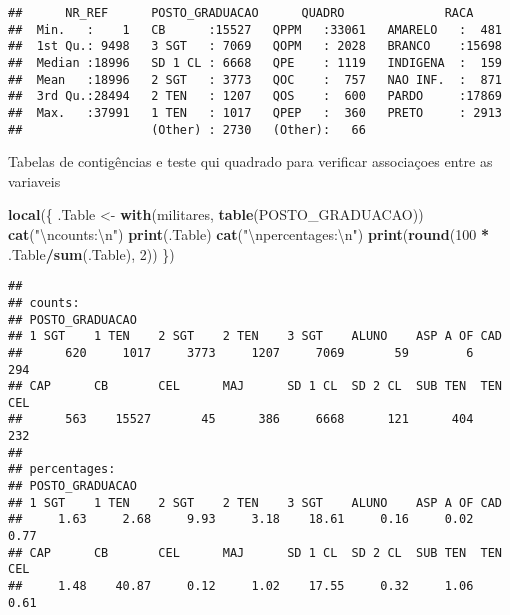 \documentclass[
]{article}
\newenvironment{Shaded}{\begin{snugshade}}{\end{snugshade}}
\newcommand{\CharTok}[1]{\textcolor[rgb]{0.31,0.60,0.02}{#1}}
\newcommand{\DecValTok}[1]{\textcolor[rgb]{0.00,0.00,0.81}{#1}}
\newcommand{\KeywordTok}[1]{\textcolor[rgb]{0.13,0.29,0.53}{\textbf{#1}}}
\newcommand{\NormalTok}[1]{#1}
\newcommand{\OperatorTok}[1]{\textcolor[rgb]{0.81,0.36,0.00}{\textbf{#1}}}
\newcommand{\StringTok}[1]{\textcolor[rgb]{0.31,0.60,0.02}{#1}}
\begin{document}
\begin{verbatim}
##      NR_REF      POSTO_GRADUACAO      QUADRO              RACA      
##  Min.   :    1   CB      :15527   QPPM   :33061   AMARELO   :  481  
##  1st Qu.: 9498   3 SGT   : 7069   QOPM   : 2028   BRANCO    :15698  
##  Median :18996   SD 1 CL : 6668   QPE    : 1119   INDIGENA  :  159  
##  Mean   :18996   2 SGT   : 3773   QOC    :  757   NAO INF.  :  871  
##  3rd Qu.:28494   2 TEN   : 1207   QOS    :  600   PARDO     :17869  
##  Max.   :37991   1 TEN   : 1017   QPEP   :  360   PRETO     : 2913  
##                  (Other) : 2730   (Other):   66
\end{verbatim}

Tabelas de contigências e teste qui quadrado para verificar associaçoes
entre as variaveis

\begin{Shaded}
\begin{Highlighting}[]
\KeywordTok{local}\NormalTok{(\{}
\NormalTok{    .Table <-}\StringTok{ }\KeywordTok{with}\NormalTok{(militares, }\KeywordTok{table}\NormalTok{(POSTO_GRADUACAO))}
    \KeywordTok{cat}\NormalTok{(}\StringTok{"}\CharTok{\textbackslash{}n}\StringTok{counts:}\CharTok{\textbackslash{}n}\StringTok{"}\NormalTok{)}
    \KeywordTok{print}\NormalTok{(.Table)}
    \KeywordTok{cat}\NormalTok{(}\StringTok{"}\CharTok{\textbackslash{}n}\StringTok{percentages:}\CharTok{\textbackslash{}n}\StringTok{"}\NormalTok{)}
    \KeywordTok{print}\NormalTok{(}\KeywordTok{round}\NormalTok{(}\DecValTok{100} \OperatorTok{*}\StringTok{ }\NormalTok{.Table}\OperatorTok{/}\KeywordTok{sum}\NormalTok{(.Table), }\DecValTok{2}\NormalTok{))}
\NormalTok{\})}
\end{Highlighting}
\end{Shaded}

\begin{verbatim}
## 
## counts:
## POSTO_GRADUACAO
## 1 SGT    1 TEN    2 SGT    2 TEN    3 SGT    ALUNO    ASP A OF CAD      
##      620     1017     3773     1207     7069       59        6      294 
## CAP      CB       CEL      MAJ      SD 1 CL  SD 2 CL  SUB TEN  TEN CEL  
##      563    15527       45      386     6668      121      404      232 
## 
## percentages:
## POSTO_GRADUACAO
## 1 SGT    1 TEN    2 SGT    2 TEN    3 SGT    ALUNO    ASP A OF CAD      
##     1.63     2.68     9.93     3.18    18.61     0.16     0.02     0.77 
## CAP      CB       CEL      MAJ      SD 1 CL  SD 2 CL  SUB TEN  TEN CEL  
##     1.48    40.87     0.12     1.02    17.55     0.32     1.06     0.61
\end{verbatim}
\end{document}
